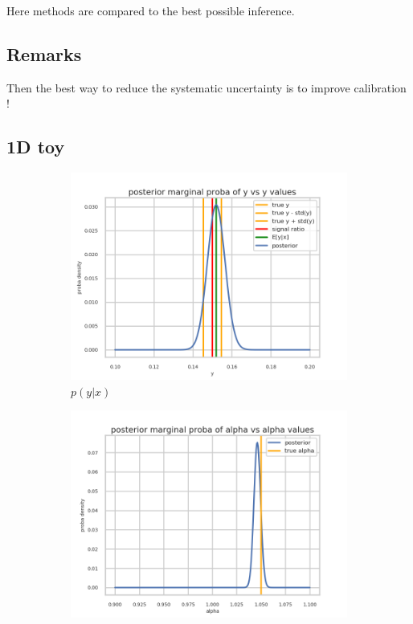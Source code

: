Here methods are compared to the best possible inference.


\subsection{Remarks} %
\label{sub:remarks}

Then the best way to reduce the systematic uncertainty is to improve calibration !


\subsection{1D toy} %
\label{sub:1d_toy}



\begin{figure}[htb]
  \centering
  \begin{subfigure}[t]{0.49\linewidth}
    \includegraphics[width=\linewidth]{minitoy/marginal_y.png}
    \caption{$p(y|x)$}
    \label{fig:marginal_y}
  \end{subfigure}%
  \hfill
  \begin{subfigure}[t]{0.49\linewidth}
    \includegraphics[width=\linewidth]{minitoy/marginal_alpha.png}

\end{subfigure}
\end{figure}
